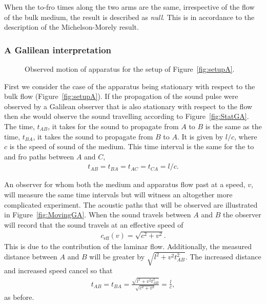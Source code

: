 \documentclass[10pt, fleqn,final,showtrims,oldfontcommands, article,a4paper,oneside]{memoir} %
\newcommand{\figref}[1]{Figure~\ref{fig:#1}}
\newcommand{\eff}{{\textrm{eff}}}
\newcommand*\she {she\xspace}
\begin{document}
When the to-fro times along the two arms are the same, irrespective of the flow  of the bulk medium,  the result is described as {\em null}.
This is in accordance to the description of the Michelson-Morely result.

\subsubsection{A Galilean interpretation}\label{sec:MMGalilean}

 \begin{figure}[t]
      \centering
\hspace{2cm}
\label{fig:GalileanA}
      \caption{Observed motion of apparatus for the setup of \figref{setupA}.}
 \end{figure}

First we consider the case of the apparatus being stationary with respect to the bulk flow (\figref{setupA}).
If the propagation of the sound pulse were observed by a Galilean observer that is also stationary with respect to the flow
then \she would observe the sound travelling according to \figref{StatGA}.
The time, $t_{AB}$,  it takes for the sound to propagate from $A$ to $B$ is the same as the time, $t_{BA}$, it takes the sound to propagate from $B$ to $A$.
It is given by $l/c$, where  $c$ is the speed of sound of the medium.
This time interval is the same for the to and fro paths between $A$ and $C$,
\begin{align}
  t_{AB}=t_{BA}=t_{AC}=t_{CA}=l/c\label{eqn:setupA:stationary:Tab}.
\end{align}

An observer for whom  both the medium and apparatus flow past at a speed, $v$, will measure the same time intervals 
but will witness an altogether more complicated experiment.
The acoustic paths that will be observed are illustrated in \figref{MovingGA}.
When the sound travels between $A$ and $B$ the observer will record that the sound travels at an effective speed of
\begin{align}
\label{eqn:ceffone}
c_\eff(v) = \sqrt{c^2 +v^2}.
\end{align}
This is due to  the  contribution of the  laminar flow.
Additionally, the measured distance between $A$ and $B$ will be greater by  $\sqrt{l^2+v^2t_{AB}^2}$.
The increased distance and increased speed cancel so that 
\begin{align}
  \label{eqn:setupA:moving:Tab}
  t_{AB} = t_{BA} = \frac{\sqrt{l^2+v^2t_{AB}^2}}{\sqrt{c^2 +v^2}} = \frac{l}{c},
\end{align}
as before.
\end{document}
